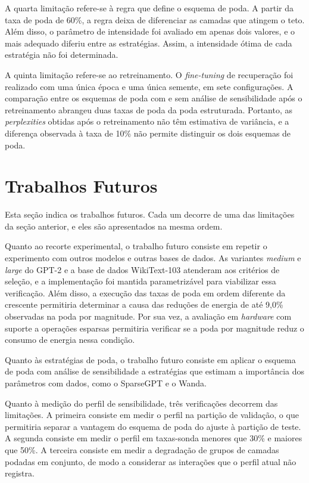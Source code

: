 A quarta limitação refere-se à regra que define o esquema de poda. A partir da taxa de poda de
60\%, a regra deixa de diferenciar as camadas que atingem o teto. Além disso, o parâmetro de
intensidade foi avaliado em apenas dois valores, e o mais adequado diferiu entre as
estratégias. Assim, a intensidade ótima de cada estratégia não foi determinada.

A quinta limitação refere-se ao retreinamento. O \textit{fine-tuning} de recuperação foi
realizado com uma única época e uma única semente, em sete configurações. A comparação entre os
esquemas de poda com e sem análise de sensibilidade após o retreinamento abrangeu duas taxas de
poda da poda estruturada. Portanto, as \textit{perplexities} obtidas após o retreinamento não
têm estimativa de variância, e a diferença observada à taxa de 10\% não permite distinguir os
dois esquemas de poda.

\section{Trabalhos Futuros}\label{sec:trabalhos_futuros}

Esta seção indica os trabalhos futuros. Cada um decorre de uma das limitações da
seção anterior, e eles são apresentados na mesma ordem.

Quanto ao recorte experimental, o trabalho futuro consiste em repetir o experimento com outros
modelos e outras bases de dados. As variantes \textit{medium} e \textit{large} do GPT-2 e a base
de dados WikiText-103 atenderam aos critérios de seleção, e a implementação foi mantida parametrizável para
viabilizar essa verificação. Além disso, a execução das taxas de poda em ordem
diferente da crescente permitiria determinar a causa das reduções de energia de até 9,0\%
observadas na poda por magnitude. Por sua vez, a avaliação em
\textit{hardware} com suporte a operações esparsas permitiria verificar se a poda por magnitude
reduz o consumo de energia nessa condição.

Quanto às estratégias de poda, o trabalho futuro consiste em aplicar o esquema de poda com
análise de sensibilidade a estratégias que estimam a importância dos parâmetros com dados, como
o SparseGPT e o Wanda.

Quanto à medição do perfil de sensibilidade, três verificações decorrem das limitações. A
primeira consiste em medir o perfil na partição de validação, o que permitiria separar a
vantagem do esquema de poda do ajuste à partição de teste. A segunda consiste em medir o perfil
em taxas-sonda menores que 30\% e maiores que 50\%. A terceira consiste em medir a degradação
de grupos de camadas podadas em conjunto, de modo a considerar as interações que o perfil atual
não registra.

